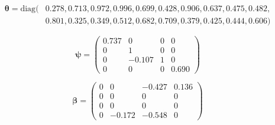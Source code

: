 \documentclass[11pt]{article}
\begin{document}
\begin{minipage}{0.76\linewidth}
\begin{align*}
\pmb{\theta} = \textrm{diag}(& 0.278, 0.713, 0.972, 0.996, 0.699, 0.428, 0.906, 0.637 ,0.475, 0.482, \\
                             & 0.801, 0.325, 0.349, 0.512, 0.682, 0.709, 0.379, 0.425, 0.444, 0.606)
\end{align*}
\end{minipage}

\begin{minipage}{0.33\linewidth}
  \begin{equation*}
    \pmb{\psi} = 
      \begin{pmatrix}
      0.737 &  0     &  0     & 0     \\
      0     &  1     &  0     & 0     \\
      0     & -0.107 &  1     & 0     \\
      0     &  0     &  0     & 0.690
      \end{pmatrix}
  \end{equation*}
\end{minipage}

\begin{minipage}{0.34\linewidth}
  \begin{equation*}
    \pmb{\beta} = 
      \begin{pmatrix}
      0 &  0     & -0.427 & 0.136 \\
      0 &  0     &  0     & 0     \\
      0 &  0     &  0     & 0     \\
      0 & -0.172 & -0.548 & 0    
      \end{pmatrix}
  \end{equation*}
\end{minipage}
\end{document}
